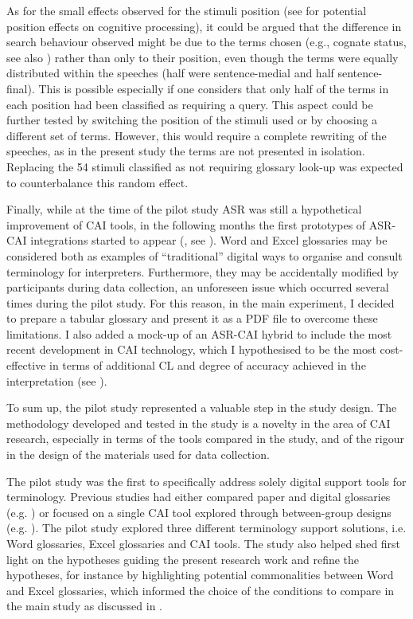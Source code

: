 As for the small effects observed for the stimuli position (see  for potential position effects on cognitive processing), it could be argued that the difference in search behaviour observed might be due to the terms chosen (e.g., cognate status, see also ) rather than only to their position, even though the terms were equally distributed within the speeches (half were sentence-medial and half sentence-final). This is possible especially if one considers that only half of the terms in each position had been classified as requiring a query. This aspect could be further tested by switching the position of the stimuli used or by choosing a different set of terms. However, this would require a complete rewriting of the speeches, as in the present study the terms are not presented in isolation. Replacing the 54 stimuli classified as not requiring glossary look-up was expected to counterbalance this random effect.

Finally, while at the time of the pilot study ASR was still a hypothetical improvement of CAI tools, in the following months the first prototypes of ASR-CAI integrations started to appear (\citealt{fantinuoli_computer-assisted_2017}, see ). Word and Excel glossaries may be considered both as examples of ``traditional'' digital ways to organise and consult terminology for interpreters. Furthermore, they may be accidentally modified by participants during data collection, an unforeseen issue which occurred several times during the pilot study. For this reason, in the main experiment, I decided to prepare a tabular glossary and present it as a PDF file to overcome these limitations. I also added a mock-up of an ASR-CAI hybrid to include the most recent development in CAI technology, which I hypothesised to be the most cost-effective in terms of additional CL and degree of accuracy achieved in the interpretation (see ).

To sum up, the pilot study represented a valuable step in the study design. The methodology developed and tested in the study is a novelty in the area of CAI research, especially in terms of the tools compared in the study, and of the rigour in the design of the materials used for data collection.

The pilot study was the first to specifically address solely digital support tools for terminology. Previous studies had either compared paper and digital glossaries (e.g. \citealt{biagini_glossario_2015}) or focused on a single CAI tool explored through be\-tween-group designs (e.g. \citealt{prandi_uso_2015,prandi_use_2015,gacek_softwarelosungen_2015}). The pilot study explored three different terminology support solutions, i.e. Word glossaries, Excel glossaries and CAI tools. The study also helped shed first light on the hypotheses guiding the present research work and refine the hypotheses, for instance by highlighting potential commonalities between Word and Excel glossaries, which informed the choice of the conditions to compare in the main study as discussed in .


